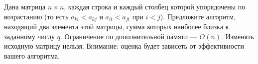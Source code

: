 \documentclass{article}
\begin{document}
Дана матрица $n\times n$, каждая строка и каждый столбец которой упорядочены по возрастанию
(то есть $a_{ki} < a_{kj}$ и $a_{it} < a_{jt}$ при $i<j$). Предложите алгоритм, находящий два элемента
этой матрицы, сумма которых наиболее близка к заданному числу $q$. Ограничение по дополнительной памяти --- $O(n)$. Изменять 
исходную матрицу нельзя. Внимание: оценка будет зависеть от эффективности вашего алгоритма.
\end{document}
